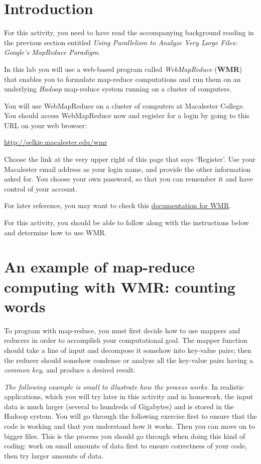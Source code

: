 \documentclass[letterpaper,10pt,openany,oneside]{sphinxmanual}
\begin{document}
\section{Introduction}
\label{wmr_basic/wmr_multi_language:introduction}
For this activity, you need to have read the accompanying
background reading in the previous section entitled
\emph{Using Parallelism to Analyze Very Large Files: Google's MapReduce Paradigm}.

In this lab you will use a web-based program called \emph{WebMapReduce}
(\textbf{WMR}) that enables you to formulate map-reduce computations and
run them on an underlying \emph{Hadoop} map-reduce system running on a
cluster of computers.

You will use WebMapReduce on a cluster of computers at Macalester
College. You should access WebMapReduce now and register for a
login by going to this URL on your web browser:

\href{http://selkie.macalester.edu/wmr}{http://selkie.macalester.edu/wmr}

Choose the link at the very upper right of this page that says
`Register'. Use your Macalester email address as your login name,
and provide the other information asked for. You choose your own
password, so that you can remember it and have control of your
account.

For later reference, you may want to check this \href{http://webmapreduce.sourceforge.net/docs/using/index.html}{documentation for
WMR}.

For this activity, you should be able to follow along with the
instructions below and determine how to use WMR.


\section{An example of map-reduce computing with WMR: counting words}
\label{wmr_basic/wmr_multi_language:an-example-of-map-reduce-computing-with-wmr-counting-words}
To program with map-reduce, you must first decide how to use
mappers and reducers in order to accomplish your computational
goal. The mapper function should take a line of input and decompose
it somehow into key-value pairs; then the reducer should somehow
condense or analyze all the key-value pairs having a \emph{common key},
and produce a desired result.

\emph{The following example is small to illustrate how the process works.}
In realistic applications, which you will try later in this
activity and in homework, the input data is much larger (several to
hundreds of Gigabytes) and is stored in the Hadoop system. You will
go through the following exercise first to ensure that the code is
working and that you understand how it works. Then you can move on
to bigger files. This is the process you should go through when
doing this kind of coding: work on small amounts of data first to
ensure correctness of your code, then try larger amounts of data.
\end{document}

